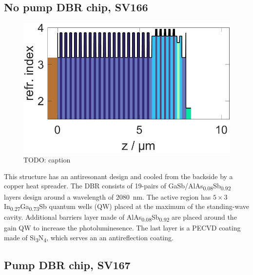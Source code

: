

\subsection*{No pump DBR chip, SV166}

\begin{figure}
    \vspace{-\baselineskip}
    \centering
    \includegraphics[width=.98\textwidth]{images/1SV166.lay.png}
    \caption{TODO: caption}
    \label{fig:sv166}
\end{figure}

This structure has an antiresonant design and cooled from the backside by a copper heat spreader. The DBR consists of 19-pairs of GaSb/AlAs\textsubscript{0.08}Sb\textsubscript{0.92} layers design around a wavelength of \qty{2080}{nm}. The active region has $5\times3$ In\textsubscript{0.27}Ga\textsubscript{0.73}Sb quantum wells (QW) placed at the maximum of the standing-wave cavity. Additional barriers layer made of AlAs\textsubscript{0.08}Sb\textsubscript{0.92} are placed around the gain QW to increase the photoluminesence. The last layer is a PECVD coating made of Si\textsubscript{3}N\textsubscript{4}, which serves an an antireflection coating.


\subsection*{Pump DBR chip, SV167}

